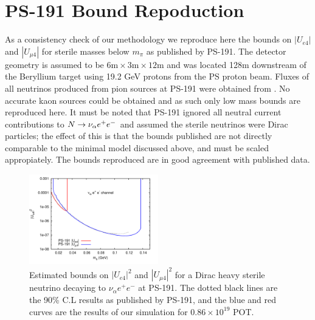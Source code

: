 \documentclass[11pt, a4paper]{article}
\def\ster{\ensuremath N}
\begin{document}
\section{PS-191 Bound Repoduction\label{sec:ps191}}

As a consistency check of our methodology we reproduce here the bounds on
$|U_{e4}|$ and $|U_{\mu 4}|$ for sterile masses below $m_\pi$ as published by
PS-191. The detector geometry is assumed to be $6\text{m} \times 3\text{m}
\times 12 \text{m}$ and was located 128m downstream of the Beryllium target
using 19.2 GeV protons from the PS proton beam.  Fluxes of all neutrinos
produced from pion sources at PS-191 were obtained from \cite{ps191THesis}. No
accurate kaon sources could be obtained and as such only low mass bounds are
reproduced here. It must be noted that PS-191 ignored all neutral current
contributions to $\ster \rightarrow \nu_\alpha e^+ e^-$ and assumed the sterile
neutrinos were Dirac particles; the effect of this is that the bounds published
are not directly comparable to the minimal model discussed above, and must be
scaled appropiately. The bounds reproduced are in good agreement with published
data.

\begin{figure}
			  \centering
			 
\includegraphics[width=0.5\textwidth]{figures/PS-191_test.pdf}

\caption{\label{fig:ps191test} Estimated bounds on $|U_{e4}|^2$ and $|U_{\mu
4}|^2$ for a Dirac heavy sterile neutrino decaying to $\nu_\alpha e^+ e^-$ at
PS-191. The dotted black lines are the 90\% C.L results as published by PS-191,
and the blue and red curves are the results of our simulation for $0.86 \times
10^{19}$ POT.}

\end{figure}
\end{document}
